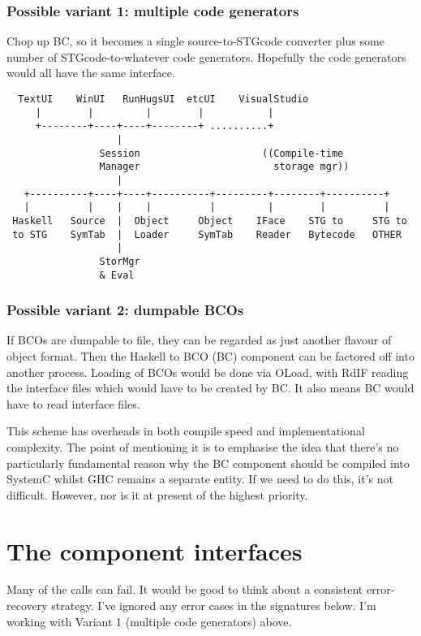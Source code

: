 \subsubsection*{Possible variant 1: multiple code generators}
Chop up BC, so it becomes a single source-to-STGcode converter
plus some number of STGcode-to-whatever code generators.
Hopefully the code generators would all have the same interface.
\begin{verbatim}
  TextUI    WinUI   RunHugsUI  etcUI    VisualStudio
     |        |         |        |           |
     +--------+----+----+--------+ ..........+
                   |
                Session                     ((Compile-time
                Manager                       storage mgr))
                   |
   +----------+----+----+----------+---------+--------+----------+
   |          |    |    |          |         |        |          |
 Haskell   Source  |  Object     Object    IFace    STG to     STG to
 to STG    SymTab  |  Loader     SymTab    Reader   Bytecode   OTHER
                   |
                StorMgr
                & Eval
\end{verbatim}

\subsubsection*{Possible variant 2: dumpable BCOs}
If BCOs are dumpable to file, they can be regarded as just another
flavour of object format.  Then the Haskell to BCO (BC) component can
be factored off into another process.  Loading of BCOs would be done
via OLoad, with RdIF reading the interface files which would have
to be created by BC.  It also means BC would have to read
interface files.

This scheme has overheads in both compile speed and
implementational complexity.  The point of mentioning it is to
emphasise the idea that there's no particularly fundamental reason why
the BC component should be compiled into SystemC whilst GHC remains a
separate entity.  If we need to do this, it's not difficult.
However, nor is it at present of the highest priority.


\section{The component interfaces}

Many of the calls can fail.  It would be good to think about a
consistent error-recovery strategy.  I've ignored any error cases
in the signatures below.  I'm working with Variant 1 (multiple code
generators) above.



